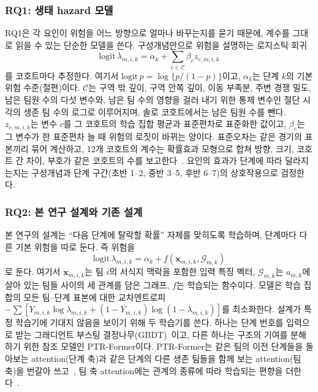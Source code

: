\subsubsection{RQ1: 생태 hazard 모델}
\label{sec:method:rq1}
RQ1은 각 요인이 위험을 어느 방향으로 얼마나 바꾸는지를 묻기 때문에, 계수를 그대로 읽을 수 있는 단순한 모델을 쓴다.
구성개념만으로 위험을 설명하는 로지스틱 회귀
\begin{equation}
\mathrm{logit}\,\lambda_{m,i,k}=\alpha_k+\textstyle\sum_{c\in\mathcal{C}}\beta_c z_{c,m,i,k}
\label{eq:ehm}
\end{equation}
를 코호트마다 추정한다.
여기서 $\mathrm{logit}\,p=\log\{p/(1-p)\}$이고, $\alpha_k$는 단계 $k$의 기본 위험 수준(절편)이다.
$\mathcal{C}$는 구역 밖 깊이, 구역 안쪽 깊이, 이동 부족분, 주변 경쟁 밀도, 남은 팀원 수의 다섯 변수와, 남은 팀 수의 영향을 걸러 내기 위한 통제 변수인 절단 시각의 생존 팀 수의 로그로 이루어지며, 솔로 코호트에서는 남은 팀원 수를 뺀다.
$z_{c,m,i,k}$는 변수 $c$를 그 코호트의 학습 집합 평균과 표준편차로 표준화한 값이고, $\beta_c$는 그 변수가 한 표준편차 늘 때 위험의 로짓이 바뀌는 양이다.
표준오차는 같은 경기의 표본끼리 묶어 계산하고, 12개 코호트의 계수는 확률효과 모형으로 합쳐 방향, 크기, 코호트 간 차이, 부호가 같은 코호트의 수를 보고한다~\cite{DerSimonian86}.
요인의 효과가 단계에 따라 달라지는지는 구성개념과 단계 구간(초반 1--2, 중반 3--5, 후반 6--7)의 상호작용으로 검정한다.

\subsubsection{RQ2: 본 연구 설계와 기존 설계}
\label{sec:method:rq2}
본 연구의 설계는 “다음 단계에 탈락할 확률” 자체를 맞히도록 학습하며, 단계마다 다른 기본 위험을 따로 둔다.
즉 위험을
\begin{equation}
\mathrm{logit}\,\lambda_{m,i,k}=\alpha_k+f(\mathbf{x}_{m,i,k},\mathcal{G}_{m,k})
\label{eq:logit}
\end{equation}
로 둔다. 여기서 $\mathbf{x}_{m,i,k}$는 팀 $i$의 서식지 맥락을 포함한 입력 특징 벡터, $\mathcal{G}_{m,k}$는 $a_{m,k}$에 살아 있는 팀들 사이의 세 관계를 담은 그래프, $f$는 학습되는 함수이다.
모델은 학습 집합의 모든 팀--단계 표본에 대한 교차엔트로피 $-\sum[Y_{m,i,k}\log\lambda_{m,i,k}+(1-Y_{m,i,k})\log(1-\lambda_{m,i,k})]$를 최소화한다.
설계가 특정 학습기에 기대지 않음을 보이기 위해 두 학습기를 쓴다.
하나는 단계 번호를 입력으로 받는 그래디언트 부스팅 결정나무(GBDT)~\cite{Friedman01}이고, 다른 하나는 구조의 기여를 분해하기 위한 참조 모델인 PTR-Former이다.
PTR-Former는 같은 팀의 이전 단계들을 돌아보는 attention(단계 축)과 같은 단계의 다른 생존 팀들을 함께 보는 attention(팀 축)을 번갈아 쓰고~\cite{Vaswani17}, 팀 축 attention에는 관계의 종류에 따라 학습되는 편향을 더한다~\cite{Ying21}.

